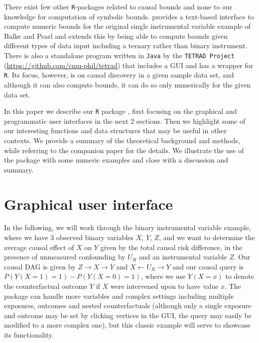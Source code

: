 There exist few other \texttt{R}-packages related to causal bounds and none to our knowledge for computation of symbolic bounds.  \citep{bpbounds-package} provides a text-based interface to compute numeric bounds for the original single instrumental variable example of Balke and Pearl and extends this by being able to compute bounds given different types of data input including a ternary rather than binary instrument. There is also a standalone program written in \texttt{Java} by the \texttt{TETRAD\ Project} (\url{https://github.com/cmu-phil/tetrad}) that includes a GUI and has a wrapper for \texttt{R}. Its focus, however, is on causal discovery in a given sample data set, and although it can also compute bounds, it can do so only numerically for the given data set.

In this paper we describe our \texttt{R} package , first focusing on the graphical and programmatic user interfaces in the next 2 sections. Then we highlight some of our interesting functions and data structures that may be useful in other contexts. We provide a summary of the theoretical background and methods, while referring to the companion paper \citet{generalcausalbounds} for the details. We illustrate the use of the package with some numeric examples and close with a discussion and summary.

\hypertarget{graphical-user-interface}{%
\section{Graphical user interface}\label{graphical-user-interface}}

In the following, we will work through the binary instrumental variable example, where we have 3 observed binary variables \(X\), \(Y\), \(Z\), and we want to determine the average causal effect of \(X\) on \(Y\) given by the total causal risk difference, in the presence of unmeasured confounding by \(U_R\) and an instrumental variable \(Z\). Our causal DAG is given by \(Z\to X\to Y\) and \(X\leftarrow U_R\to Y\) and our causal query is \(P(Y(X=1)=1)-P(Y(X=0)=1)\), where we use \(Y(X = x)\) to denote the counterfactual outcome \(Y\) if \(X\) were intervened upon to have value \(x\). The package can handle more variables and complex settings including multiple exposures, outcomes and nested counterfactuals (although only a single exposure and outcome may be set by clicking vertices in the GUI, the query may easily be modified to a more complex one), but this classic example will serve to showcase its functionality.

